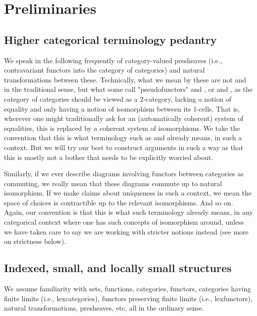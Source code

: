 \section{Preliminaries}

\subsection{Higher categorical terminology pedantry}
We speak in the following frequently of category-valued presheaves (i.e., contravariant functors into the category of categories) and natural transformations between these. Technically, what we mean by these are not  and  in the traditional sense, but what some call "pseudofunctors" and , or  and , as the category of categories should be viewed as a 2-category, lacking a notion of equality and only having a notion of isomorphism between its 1-cells. That is, wherever one might traditionally ask for an (automatically coherent) system of equalities, this is replaced by a coherent system of isomorphisms. We take the convention that this is what terminology such as  and  already means, in such a context. But we will try our best to construct arguments in such a way as that this is mostly not a bother that needs to be explicitly worried about.

Similarly, if we ever describe diagrams involving functors between categories as commuting, we really mean that these diagrams commute up to natural isomorphism. If we make claims about uniqueness in such a context, we mean the space of choices is contractible up to the relevant isomorphisms. And so on. Again, our convention is that this is what such terminology already means, in any categorical context where one has such concepts of isomorphism around, unless we have taken care to say we are working with stricter notions instead (see more on strictness below).

\subsection{Indexed, small, and locally small structures}
We assume familiarity with sets, functions, categories, functors, categories having finite limits (i.e., lexcategories), functors preserving finite limits (i.e., lexfunctors), natural transformations, presheaves, etc, all in the ordinary sense.

